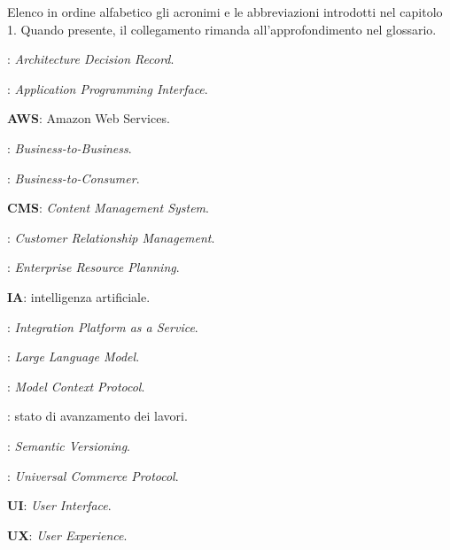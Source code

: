 

Elenco in ordine alfabetico gli acronimi e le abbreviazioni introdotti nel capitolo 1. Quando
presente, il collegamento rimanda all’approfondimento nel glossario.

: \emph{Architecture Decision Record}.

: \emph{Application Programming Interface}.

\textbf{AWS}: Amazon Web Services.

: \emph{Business-to-Business}.

: \emph{Business-to-Consumer}.

\textbf{CMS}: \emph{Content Management System}.

: \emph{Customer Relationship Management}.

: \emph{Enterprise Resource Planning}.

\textbf{IA}: intelligenza artificiale.

: \emph{Integration Platform as a Service}.

: \emph{Large Language Model}.

: \emph{Model Context Protocol}.

: stato di avanzamento dei lavori.

: \emph{Semantic Versioning}.

: \emph{Universal Commerce Protocol}.

\textbf{UI}: \emph{User Interface}.

\textbf{UX}: \emph{User Experience}.
